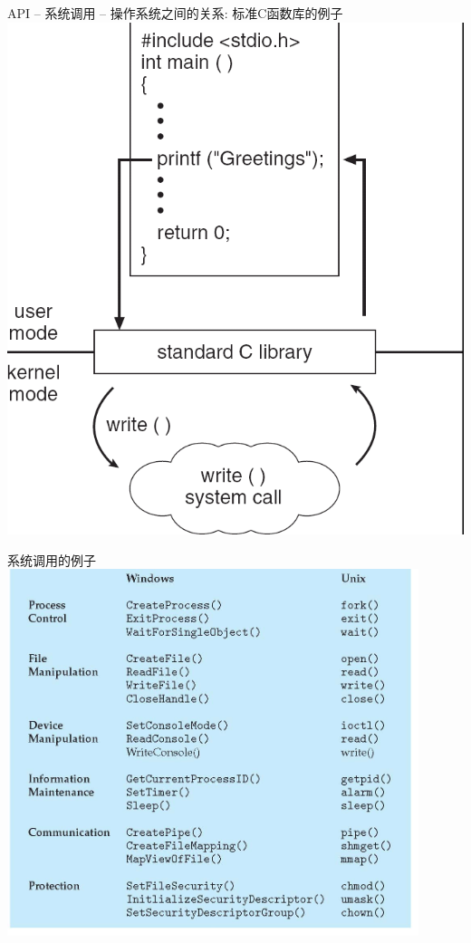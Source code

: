 \documentclass[xcolor=svgnames]{beamer}
\begin{document}
\begin{CJK*}{UTF8}{gbsn}
\begin{frame}{API -- 系统调用 -- 操作系统之间的关系: 标准C函数库的例子}
\includegraphics[width=1.0\textwidth]{printf.png}
\end{frame}

\begin{frame}{系统调用的例子}
\includegraphics[width=0.9\textwidth]{examples.jpg}
\end{frame}


\end{CJK*}
\end{document}
